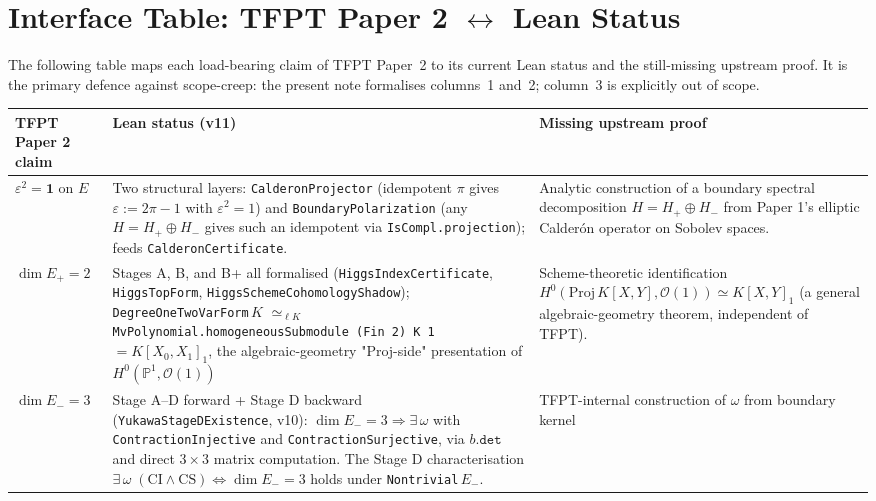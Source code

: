 \section{Interface Table: TFPT Paper 2 \texorpdfstring{$\leftrightarrow$}{<->} Lean Status}
\label{sec:interface-table}

The following table maps each load-bearing claim of TFPT
Paper~2 to its current Lean status and the still-missing
upstream proof. It is the primary defence against scope-creep:
the present note formalises columns~1 and~2; column~3 is
explicitly out of scope.

\smallskip
\begin{center}
\footnotesize
\begin{tabularx}{\textwidth}{@{}p{}p{}Y@{}}
\toprule
\textbf{TFPT Paper 2 claim} & \textbf{Lean status (v11)} & \textbf{Missing upstream proof} \\
\midrule
$\varepsilon^2 = \mathbf 1$ on $E$ &
  Two structural layers: \texttt{CalderonProjector}
  (idempotent $\pi$ gives $\varepsilon := 2\pi-1$ with $\varepsilon^2 = 1$)
  and \texttt{BoundaryPolarization} (any
  $H = H_+ \oplus H_-$ gives such an idempotent via
  \texttt{IsCompl.projection}); feeds
  \texttt{CalderonCertificate}. &
  Analytic construction of a boundary spectral decomposition
  $H = H_+ \oplus H_-$ from Paper 1's elliptic Calder\'on
  operator on Sobolev spaces. \\[3pt]
$\dim E_+ = 2$ &
  Stages A, B, and B+ all formalised
  (\texttt{HiggsIndexCertificate},
  \texttt{HiggsTopForm},
  \texttt{HiggsSchemeCohomologyShadow});
  \texttt{DegreeOneTwoVarForm}\,$K$ $\simeq_{\ell K}$
  \texttt{MvPolynomial.homogeneousSubmodule (Fin 2) K 1}
  $= K[X_0, X_1]_1$, the algebraic-geometry "Proj-side"
  presentation of $H^0(\mathbb P^1, \mathcal O(1))$ &
  Scheme-theoretic identification
  $H^0(\mathrm{Proj}\,K[X,Y], \mathcal O(1)) \simeq K[X, Y]_1$
  (a general algebraic-geometry theorem, independent of TFPT). \\[3pt]
$\dim E_- = 3$ &
  Stage A--D forward + Stage D backward
  (\texttt{YukawaStageDExistence}, v10):
  $\dim E_- = 3 \Rightarrow \exists\,\omega$
  with \texttt{ContractionInjective} and
  \texttt{ContractionSurjective}, via $b.\texttt{det}$ and
  direct $3{\times}3$ matrix computation. The Stage D
  characterisation
  $\exists\,\omega\;(\textrm{CI} \wedge \textrm{CS})
    \iff \dim E_- = 3$ holds under \texttt{Nontrivial}\,$E_-$. &
  TFPT-internal construction of $\omega$ from boundary kernel

\end{tabularx}
\end{center}
